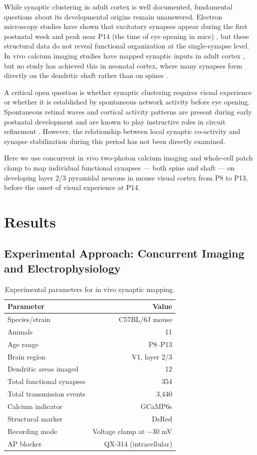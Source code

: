 \documentclass[11pt]{article}
\begin{document}
While synaptic clustering in adult cortex is well documented, fundamental questions about its developmental origins remain unanswered. Electron microscopy studies have shown that excitatory synapses appear during the first postnatal week and peak near P14 (the time of eye opening in mice) \citep{blue1983genesis}, but these structural data do not reveal functional organization at the single-synapse level. In vivo calcium imaging studies have mapped synaptic inputs in adult cortex \citep{chen2011clustered, wilson2016orientation}, but no study has achieved this in neonatal cortex, where many synapses form directly on the dendritic shaft rather than on spines \citep{jontes2000growth}.

A critical open question is whether synaptic clustering requires visual experience or whether it is established by spontaneous network activity before eye opening. Spontaneous retinal waves and cortical activity patterns are present during early postnatal development and are known to play instructive roles in circuit refinement \citep{ackman2012retinal, blankenship2010mechanisms, katz1996synaptic}. However, the relationship between local synaptic co-activity and synapse stabilization during this period has not been directly examined.

Here we use concurrent in vivo two-photon calcium imaging and whole-cell patch clamp to map individual functional synapses --- both spine and shaft --- on developing layer 2/3 pyramidal neurons in mouse visual cortex from P8 to P13, before the onset of visual experience at P14.

\section{Results}

\subsection{Experimental Approach: Concurrent Imaging and Electrophysiology}

\begin{table}[H]
\centering
\caption{Experimental parameters for in vivo synaptic mapping.}
\label{tab:params}
\begin{tabular}{lr}
\toprule
\textbf{Parameter} & \textbf{Value} \\
\midrule
Species/strain & C57BL/6J mouse \\
Animals & 11 \\
Age range & P8--P13 \\
Brain region & V1, layer 2/3 \\
Dendritic areas imaged & 12 \\
Total functional synapses & 354 \\
Total transmission events & 3,440 \\
Calcium indicator & GCaMP6s \\
Structural marker & DsRed \\
Recording mode & Voltage clamp at $-30$ mV \\
AP blocker & QX-314 (intracellular) \\
\bottomrule
\end{tabular}
\end{table}
\end{document}
